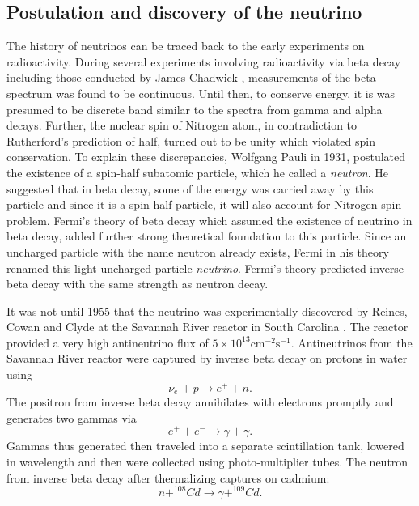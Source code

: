 \documentclass[11pt]{article}
\newcommand{\nuebar}{\ensuremath{\overline{\nu }_{e}} \hspace{1pt}}
\numberwithin{equation}{section}
\begin{document}
\subsection[Postulation and discovery]{Postulation and discovery of the neutrino}
\label{discovery}
The history of neutrinos can be traced back to the early experiments on radioactivity. During several experiments involving radioactivity via beta decay including those conducted by James Chadwick \cite{chadwick1925xxii}, measurements of the beta spectrum was found to be continuous. Until then, to conserve energy, it is was presumed to be discrete band similar to the spectra from gamma and alpha decays. Further, the nuclear spin of Nitrogen atom, in contradiction to Rutherford's prediction \cite{rasetti1929alternating} of half, turned out to be unity which violated spin conservation. To explain these discrepancies, Wolfgang Pauli \cite{PauliLetter} in 1931, postulated the existence of a spin-half subatomic particle, which he called a \textit{neutron}. He suggested that in beta decay, some of the energy was carried away by this particle and since it is a spin-half particle, it will also account for Nitrogen spin problem. Fermi's theory of beta decay \cite{betaDecay} which assumed the existence of neutrino in beta decay,  added further strong theoretical foundation to this particle. Since an uncharged particle with the name neutron already exists, Fermi in his theory renamed this light uncharged particle \textit{neutrino}. Fermi's theory predicted inverse beta decay with the same strength as neutron decay. 

It was not until 1955 that the neutrino was experimentally discovered by Reines, Cowan and Clyde at the Savannah River reactor in South Carolina \cite{reines1956neutrino}. The reactor provided a very high antineutrino flux of $ 5 \times 10^{13}\textrm{cm}^{-2} \textrm{s}^{-1} $. Antineutrinos from the Savannah River reactor were captured by inverse beta decay on protons in water using
\begin{equation}
 \nuebar + p \rightarrow e^{+} + n .
\end{equation}
The positron from inverse beta decay annihilates with electrons promptly and generates two gammas via
\begin{equation}
e^{+} + e^{-} \rightarrow \gamma + \gamma.
\end{equation}
Gammas thus generated then traveled into a separate scintillation tank, lowered in wavelength and then were collected using photo-multiplier tubes. The neutron from inverse beta decay after thermalizing captures on cadmium:
\begin{equation} 
n + ^{108}Cd \rightarrow \gamma + ^ {109}Cd.
\end{equation}
\end{document}
